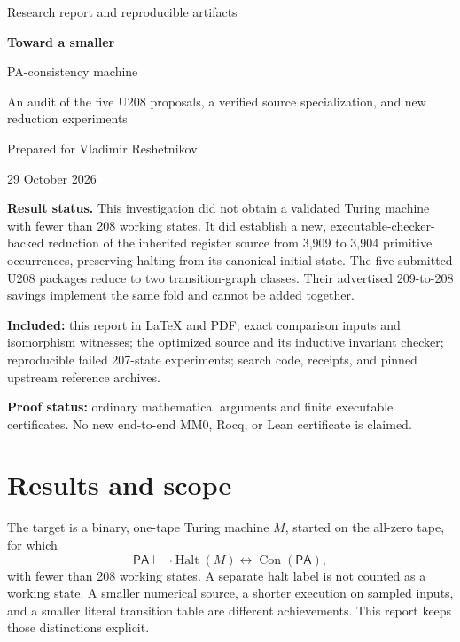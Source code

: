 \documentclass[11pt,a4paper]{article}
\theoremstyle{definition}
\newcommand{\PA}{\mathsf{PA}}
\newcommand{\Con}{\operatorname{Con}}
\newcommand{\Halt}{\operatorname{Halt}}
\begin{document}
\begin{titlepage}
\vspace*{1.2cm}
{\Large\color{muted}Research report and reproducible artifacts\par}
\vspace{0.65cm}
{\Huge\bfseries\color{ink}Toward a smaller\par PA-consistency machine\par}
\vspace{0.65cm}
{\Large An audit of the five U208 proposals, a verified source specialization, and new reduction experiments\par}
\vspace{1cm}
{\large Prepared for Vladimir Reshetnikov\par}
{\large 29 October 2026\par}
\vspace{1.1cm}
\colorbox{pale}{\parbox{0.93\textwidth}{\vspace{0.4em}
\textbf{Result status.} This investigation did not obtain a validated Turing machine with fewer than 208 working states. It did establish a new, executable-checker-backed reduction of the inherited register source from 3,909 to 3,904 primitive occurrences, preserving halting from its canonical initial state. The five submitted U208 packages reduce to two transition-graph classes. Their advertised 209-to-208 savings implement the same fold and cannot be added together.\vspace{0.4em}}}
\vfill
\textbf{Included:} this report in \LaTeX{} and PDF; exact comparison inputs and isomorphism witnesses; the optimized source and its inductive invariant checker; reproducible failed 207-state experiments; search code, receipts, and pinned upstream reference archives.

\textbf{Proof status:} ordinary mathematical arguments and finite executable certificates. No new end-to-end MM0, Rocq, or Lean certificate is claimed.
\end{titlepage}

\tableofcontents
\newpage

\section{Results and scope}

The target is a binary, one-tape Turing machine $M$, started on the all-zero tape, for which
\[
 \PA\vdash \neg\Halt(M)\longleftrightarrow\Con(\PA),
\]
with fewer than 208 working states. A separate halt label is not counted as a working state. A smaller numerical source, a shorter execution on sampled inputs, and a smaller literal transition table are different achievements. This report keeps those distinctions explicit.
\end{document}
